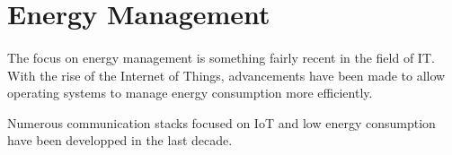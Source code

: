 \section{Energy Management}









\paragraph{}
The focus on energy management is something fairly recent in the field of IT.
With the rise of the Internet of Things, advancements have been made to allow operating systems to manage energy consumption more efficiently.

Numerous communication stacks focused on IoT and low energy consumption have been developped in the last decade.

